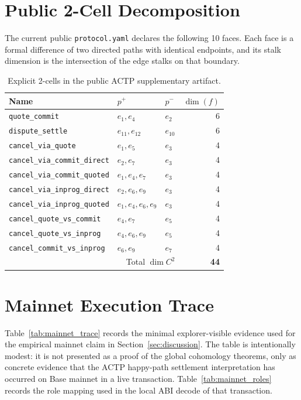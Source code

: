 \documentclass[11pt]{article}
\theoremstyle{plain}
\theoremstyle{definition}
\newcommand{\Ctwo}{C^{2}}
\newcommand{\dimn}{\operatorname{dim}}
\begin{document}
\section{Public 2-Cell Decomposition}
\label{app:faces}

The current public \texttt{protocol.yaml} declares the following 10 faces.
Each face is a formal difference of two directed paths with identical
endpoints, and its stalk dimension is the intersection of the edge stalks on
that boundary.

\begin{table}[h]
\centering
\caption{Explicit 2-cells in the public ACTP supplementary artifact.}
\label{tab:faces}
\begin{tabular}{@{}lllr@{}}
\toprule
\textbf{Name} & \textbf{$p^{+}$} & \textbf{$p^{-}$} & $\dimn(f)$ \\
\midrule
\texttt{quote\_commit} & $e_1,e_4$ & $e_2$ & 6 \\
\texttt{dispute\_settle} & $e_{11},e_{12}$ & $e_{10}$ & 6 \\
\texttt{cancel\_via\_quote} & $e_1,e_5$ & $e_3$ & 4 \\
\texttt{cancel\_via\_commit\_direct} & $e_2,e_7$ & $e_3$ & 4 \\
\texttt{cancel\_via\_commit\_quoted} & $e_1,e_4,e_7$ & $e_3$ & 4 \\
\texttt{cancel\_via\_inprog\_direct} & $e_2,e_6,e_9$ & $e_3$ & 4 \\
\texttt{cancel\_via\_inprog\_quoted} & $e_1,e_4,e_6,e_9$ & $e_3$ & 4 \\
\texttt{cancel\_quote\_vs\_commit} & $e_4,e_7$ & $e_5$ & 4 \\
\texttt{cancel\_quote\_vs\_inprog} & $e_4,e_6,e_9$ & $e_5$ & 4 \\
\texttt{cancel\_commit\_vs\_inprog} & $e_6,e_9$ & $e_7$ & 4 \\
\midrule
\multicolumn{3}{r}{Total $\dimn\Ctwo$} & \textbf{44} \\
\bottomrule
\end{tabular}
\end{table}

\section{Mainnet Execution Trace}
\label{app:mainnet}

Table~\ref{tab:mainnet_trace} records the minimal explorer-visible evidence
used for the empirical mainnet claim in Section~\ref{sec:discussion}.  The
table is intentionally modest: it is not presented as a proof of the global
cohomology theorems, only as concrete evidence that the ACTP happy-path
settlement interpretation has occurred on Base mainnet in a live transaction.
Table~\ref{tab:mainnet_roles} records the role mapping used in the local
ABI decode of that transaction.
\end{document}
